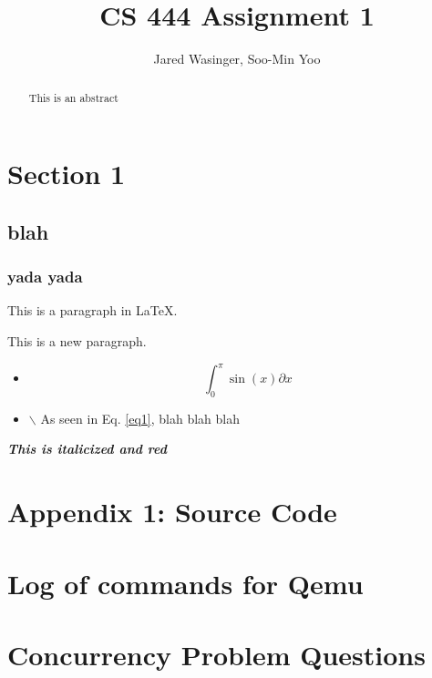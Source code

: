 \documentclass[letterpaper,10pt]{article}
\title{CS 444 Assignment 1}
\author{Jared Wasinger, Soo-Min Yoo}
\begin{document}
\maketitle
\begin{abstract}
	This is an abstract
\end{abstract}
\newpage

\tableofcontents



\section{Section 1}
\subsection{blah}
\subsubsection{yada yada}
This is a paragraph in \LaTeX.

This is a new paragraph.

\begin{itemize}
\item \begin{equation}
    \label{eq1}
    \int_0^\pi \sin(x) \partial x
    \end{equation}
\item $\backslash$ As seen in Eq. \ref{eq1}, blah blah blah
\end{itemize}

\emph{\textbf{\color{red}This is italicized and red}}

\section*{Appendix 1: Source Code}
\section*{ Log of commands for Qemu }
\section*{Concurrency Problem Questions}
\end{document}
